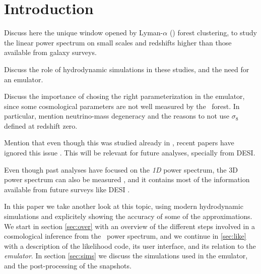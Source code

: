 \section{Introduction} 

Discuss here the unique window opened by Lyman-$\alpha$ (\lya) forest 
clustering, to study the linear power spectrum on small scales and redshifts 
higher than those available from galaxy surveys.

Discuss the role of hydrodynamic simulations in these studies, and the need 
for an emulator.

Discuss the importance of chosing the right parameterization in the emulator, 
since some cosmological parameters are not well measured by the \lya\ forest.
In particular, mention neutrino-mass degeneracy and the reasons to not use 
$\sigma_8$ defined at redshift zero.

Mention that even though this was studied already in \cite{McDonald2005a}, 
recent papers have ignored this issue \cite{Palanque-Delabrouille2015,
Yeche2017}. 
This will be relevant for future analyses, specially from DESI.

Even though past analyses have focused on the \textit{1D} power spectrum, 
the 3D power spectrum can also be measured \cite{Font-Ribera2018}, 
and it contains most of the information available from future surveys 
like DESI \cite{Font-Ribera2014}. 


In this paper we take another look at this topic, using modern hydrodynamic 
simulations and explicitely showing the accuracy of some of the approximations.
We start in section \ref{sec:over} with an overview of the different steps 
involved in a cosmological inference from the \lya\ power spectrum, and we 
continue in \ref{sec:like} with a description of the likelihood code, 
its user interface, and its relation to the \textit{emulator}.
In section \ref{sec:sims} we discuss the simulations used in the emulator, 
and the post-processing of the snapshots. 
 
